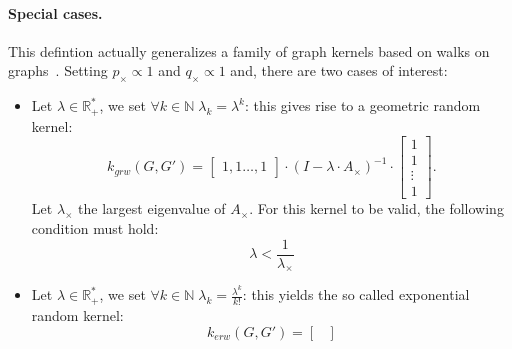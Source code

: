             \paragraph{Special cases.}
                This defintion actually generalizes a family of graph kernels based on walks on graphs~\parencite{vishwanathan2010graph}.
                Setting $p_{\times} \propto 1$ and $q_{\times} \propto 1$ and, there are two cases of interest:
                \begin{itemize}
                    \item Let \(\lambda \in \mathbb{R}^*_+\), we set \(\forall k\in \mathbb{N} \; \lambda_k = \lambda^k\): this gives rise to a geometric random kernel:
                            \begin{equation}
                                \label{eq::geometric_random_kernel}
                                k_{grw}(G, G') = \begin{bmatrix}
                                    1, 1\dots,1
                                \end{bmatrix}\cdot \left(I - \lambda\cdot A_{\times}\right)^{-1}\cdot\begin{bmatrix}
                                    1\\
                                    1\\
                                    \vdots\\
                                    1
                                \end{bmatrix}.
                            \end{equation}
                            Let \(\lambda_{\times}\) the largest eigenvalue of \(A_{\times}\).
                            For this kernel to be valid, the following condition must hold:
                            \begin{equation}
                                \label{eq::condition_geometric_kernel_convergence}
                                \lambda < \frac{1}{\lambda_{\times}}
                            \end{equation}
                    \item Let \(\lambda \in \mathbb{R}^*_+\), we set \(\forall k\in \mathbb{N} \; \lambda_k = \frac{\lambda^k}{k!}\): this yields the so called exponential random kernel:
                            \begin{equation}
                                \label{eq::geometric_random_kernel}
                                k_{erw}(G, G') = \begin{bmatrix}

\end{bmatrix}
\end{equation}
\end{itemize}
